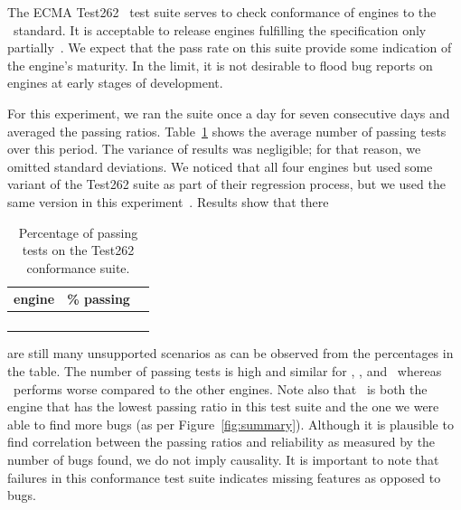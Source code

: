 \documentclass[sigconf,review, anonymous]{acmart}
\begin{document}
The ECMA Test262~\cite{ecma262-conformance-suite} test suite serves to
check conformance of engines to the \js\ standard. It is
acceptable to release engines fulfilling the specification only
partially~\cite{kangax}. We expect that the pass rate on this suite
provide some indication of the engine's maturity. In the limit, it is
not desirable to flood bug reports on engines at early stages of
development. 

For this experiment, we ran the suite once a day for seven consecutive
days and averaged the passing ratios. Table~\ref{tab:test262} shows
the average number of passing tests over this period. The variance of
results was negligible; for that reason, we omitted standard
deviations. We noticed that all four engines but \chakra{} used some
variant of the Test262 suite as part of their regression process, but
we used the same version in this
experiment~\cite{ecma262-conformance-suite}. Results show that there
\begin{table}
  \centering
  \caption{\label{tab:test262}Percentage of passing tests on
    the Test262 conformance suite.}
  \vspace{-2ex}        
  \small
  \begin{tabular}{crr}
    \toprule
    engine & \% passing \\
    \midrule
    \jsc{} & \percentSuiteTestJSC{}\\
    \veight{} & \percentSuiteTestVeight{} \\
    \chakra{} & \percentSuiteTestChakra{} \\    
    \smonkey{} & \percentSuiteTestSM{} \\
    \bottomrule
  \end{tabular}
  \normalsize
  \vspace{-4ex}
\end{table}
are still many unsupported scenarios as can be observed from the
percentages in the table. The number of passing tests is high and
similar for \jsc{}, \veight{}, and \smonkey\ whereas \chakra\ performs
worse compared to the other engines. Note also that \chakra\ is both
the engine that has the lowest passing ratio in this test suite and
the one we were able to find more bugs (as per
Figure~\ref{fig:summary}). Although it is plausible to find
correlation between the passing ratios and reliability as measured by
the number of bugs found, we do not imply causality. It is important
to note that failures in this conformance test suite indicates missing
features as opposed to bugs.
\end{document}
